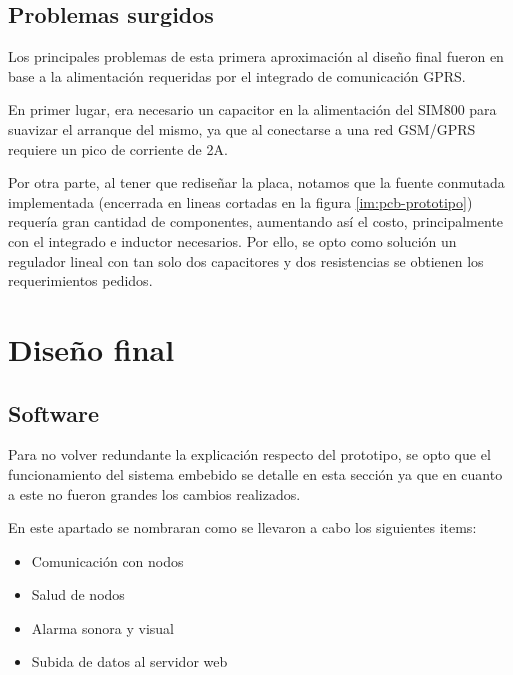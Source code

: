 \subsection{Problemas surgidos}
\par Los principales problemas de esta primera aproximación al diseño final fueron en
base a la alimentación requeridas por el integrado de comunicación GPRS.
\par En primer lugar, era necesario un capacitor en la alimentación del SIM800 para
suavizar el arranque del mismo, ya que al conectarse a una red GSM/GPRS requiere un pico
de corriente de 2A.
\par Por otra parte, al tener que rediseñar la placa, notamos que la fuente conmutada implementada 
(encerrada en lineas cortadas en la figura \ref{im:pcb-prototipo}) requería gran cantidad de 
componentes, aumentando así el costo, principalmente con el integrado e inductor necesarios. 
Por ello, se opto como solución un regulador lineal con tan solo dos capacitores y dos resistencias 
se obtienen los requerimientos pedidos. 

\section{Diseño final}
\subsection{Software}
\par Para no volver redundante la explicación respecto del prototipo, se opto que el
funcionamiento del sistema embebido se detalle en esta sección ya que en cuanto a este no
fueron grandes los cambios realizados. 
\par En este apartado se nombraran como se llevaron a cabo los siguientes items:
\begin{itemize}
    \item Comunicación con nodos
    \item Salud de nodos
    \item Alarma sonora y visual
    \item Subida de datos al servidor web
\end{itemize}

